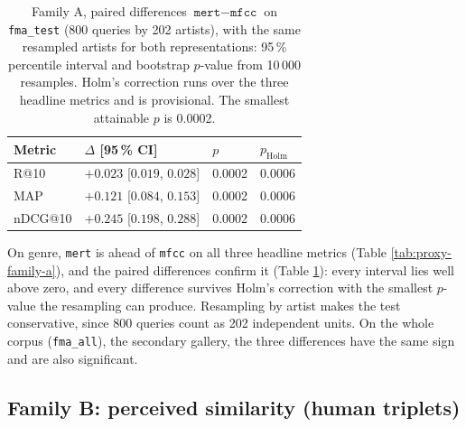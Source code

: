 \begin{table}[t]
  \centering
  \caption[Family A: paired differences between MERT and MFCC]{Family A,
    paired differences $\texttt{mert} - \texttt{mfcc}$ on \texttt{fma\_test}
    (800 queries by 202 artists), with the same resampled artists for both
    representations: 95\,\% percentile interval and bootstrap $p$-value from
    10\,000 resamples. Holm's correction runs over the three headline metrics
    and is provisional. The smallest attainable $p$ is 0.0002.}
  \label{tab:proxy-family-a-deltas}
  \begin{tabular}{@{}llll@{}}
    \toprule
    Metric & $\Delta$ [95\,\% CI] & $p$ & $p_{\text{Holm}}$ \\
    \midrule
    R@10    & $+0.023$ [$0.019$, $0.028$] & 0.0002 & 0.0006 \\
    MAP     & $+0.121$ [$0.084$, $0.153$] & 0.0002 & 0.0006 \\
    nDCG@10 & $+0.245$ [$0.198$, $0.288$] & 0.0002 & 0.0006 \\
    \bottomrule
  \end{tabular}
\end{table}

On genre, \texttt{mert} is ahead of \texttt{mfcc} on all three headline
metrics (Table \ref{tab:proxy-family-a}), and the paired differences confirm
it (Table \ref{tab:proxy-family-a-deltas}): every interval lies well above
zero, and every difference survives Holm's correction with the smallest
$p$-value the resampling can produce. Resampling by artist makes the test
conservative, since 800 queries count as 202 independent units. On the whole
corpus (\texttt{fma\_all}), the secondary gallery, the three differences have
the same sign and are also significant.

\subsection{Family B: perceived similarity (human triplets)}
\label{sec:results-proxy-human}

